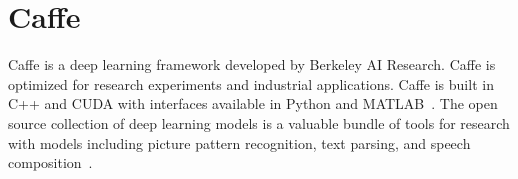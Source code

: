 \section{Caffe}

Caffe is a deep learning framework developed by Berkeley AI Research. 
Caffe is optimized for research experiments and industrial applications. 
Caffe is built in C++ and CUDA with interfaces available in Python and 
MATLAB~\cite{hid-sp18-404-Evan}. The open source collection 
of deep learning models is a valuable bundle of tools for research with 
models including picture pattern recognition, text parsing, and speech 
composition~\cite{hid-sp18-404-jia2014caffe}. 
